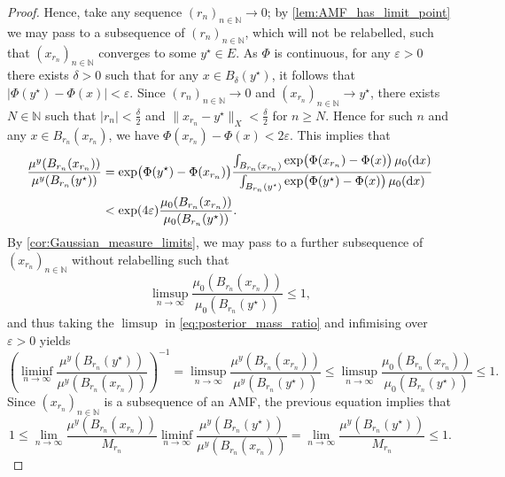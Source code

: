 \documentclass[10pt,a4paper]{amsart}
\newcommand*{\Naturals}{\mathbb{N}}
\newcommand*{\cball}[2]{B_{#2}(#1)}
\newcommand*{\rd}{\mathrm{d}}
\newcommand{\absval}[1]{\lvert #1 \rvert}
\newcommand{\norm}[1]{\lVert #1 \rVert}
\renewcommand*{\geq}{\geqslant}
\renewcommand*{\leq}{\leqslant}
\begin{document}
\begin{proof}
	Hence, take any sequence $(r_{n})_{n \in \Naturals} \to 0$; by \cref{lem:AMF_has_limit_point} we may pass to a subsequence of $(r_{n})_{n \in \Naturals}$, which will not be relabelled, such that $(x_{r_n})_{n \in \Naturals}$ converges to some $y^{\star} \in E$.
	As $\Phi$ is continuous, for any $\varepsilon > 0$ there exists $\delta > 0$ such that for any $x \in \cball{y^\star}{\delta}$, it follows that $\absval{\Phi(y^{\star}) - \Phi(x)} < \varepsilon$.
	Since $(r_n)_{n \in \Naturals} \to 0$ and $(x_{r_n})_{n \in \Naturals} \to y^{\star}$, there exists $N \in \Naturals$ such that $\absval{r_n} < \tfrac{\delta}{2}$ and $\norm{x_{r_n} - y^{\star}}_X < \tfrac{\delta}{2}$ for $n \geq N$.
	Hence for such $n$ and any $x \in \cball{x_{r_n}}{r_n}$, we have $\Phi(x_{r_n}) - \Phi(x) < 2\varepsilon$.
	This implies that
	\begin{align}
		\notag
		\frac{\mu^y(\cball{x_{r_n}}{r_n})}{\mu^y(\cball{y^{\star}}{r_n})} &= \exp\bigl(\Phi(y^{\star}) - \Phi(x_{r_n})\bigr) \frac{\int_{\cball{x_{r_n}}{r_n}} \exp\bigl(\Phi(x_{r_n}) - \Phi(x)\bigr)\,\mu_0(\rd x)}{\int_{\cball{y^{\star}}{r_n}} \exp\bigl(\Phi(y^{\star}) - \Phi(x)\bigr)\,\mu_0(\rd x)} \\
		\label{eq:posterior_mass_ratio}
		&< \exp(4\varepsilon) \frac{\mu_0(\cball{x_{r_n}}{r_n})}{\mu_0(\cball{y^{\star}}{r_n})}.
	\end{align}
	By \cref{cor:Gaussian_measure_limits}, we may pass to a further subsequence of $(x_{r_n})_{n \in \Naturals}$ without relabelling such that
	\begin{equation*}
		\limsup_{n \to \infty} \frac{\mu_0(\cball{x_{r_n}}{r_n})}{\mu_0(\cball{y^{\star}}{r_n})} \leq 1,
	\end{equation*}
	and thus taking the $\limsup$ in \eqref{eq:posterior_mass_ratio} and infimising over $\varepsilon > 0$ yields
	\begin{equation*}
		\left(\liminf_{n \to \infty} \frac{\mu^y(\cball{y^{\star}}{r_n})}{\mu^y(\cball{x_{r_n}}{r_n})}\right)^{-1} = \limsup_{n \to \infty} \frac{\mu^y(\cball{x_{r_{n}}}{r_{n}})}{\mu^y(\cball{y^{\star}}{r_{n}})} \leq \limsup_{n \to \infty} \frac{\mu_0(\cball{x_{r_{n}}}{r_{n}})}{\mu_0(\cball{y^{\star}}{r_{n}})} \leq 1.
	\end{equation*}
	Since $(x_{r_{n}})_{n \in \Naturals}$ is a subsequence of an AMF, the previous equation implies that
	\begin{equation*}
		1 \leq \lim_{n \to \infty} \frac{\mu^y(\cball{x_{r_{n}}}{r_{n}})}{M_{r_{n}}} \liminf_{n \to \infty} \frac{\mu^y(\cball{y^{\star}}{r_{n}})}{\mu^y(\cball{x_{r_{n}}}{r_{n}})} = \lim_{n \to \infty} \frac{\mu^y(\cball{y^{\star}}{r_{n}})}{M_{r_{n}}}  \leq 1.

\end{equation*}
\end{proof}
\end{document}
